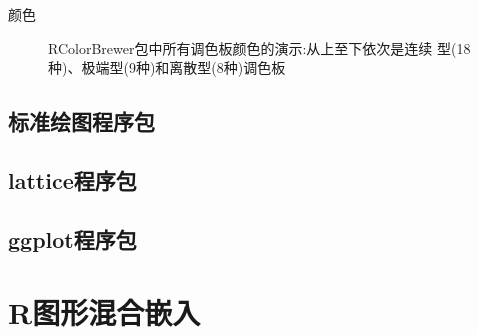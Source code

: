 \documentclass{beamerthemeMono}
\begin{document}
\begin{frame}[t]{\subsecname}{颜色}
\begin{overlayarea}{\textwidth}{\textheight}
{\begin{figure}
\begin{columns}
      \begin{column}{.4\textwidth}
        \centering
        \caption{RColorBrewer包中所有调色板颜色的演示:从上至下依次是连续
型(18种)、极端型(9种)和离散型(8种)调色板}
      \end{column}
    \end{columns}
\end{figure}}
\end{overlayarea}  
\end{frame}
\subsection{标准绘图程序包}

\subsection{lattice程序包}

\subsection{ggplot程序包}
\section{R图形混合嵌入}

\begin{frame}%
\end{frame}
\end{document}
